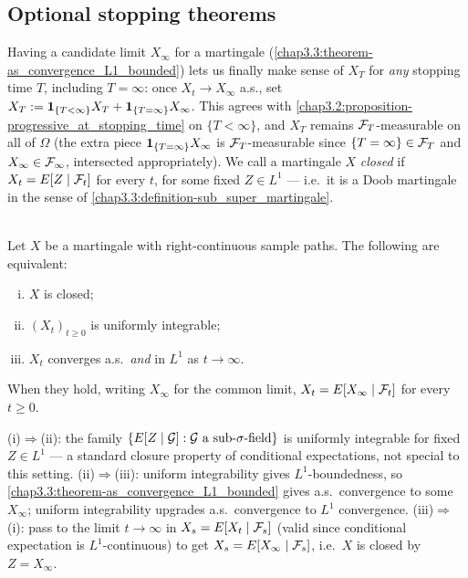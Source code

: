 \subsection{Optional stopping theorems}\label{sec:ost}
Having a candidate limit $X_\infty$ for a martingale (\cref{chap3.3:theorem-as_convergence_L1_bounded}) lets us finally make sense of $X_T$ for \emph{any} stopping time $T$, including $T=\infty$: once $X_t\to X_\infty$ a.s., set $X_T:=\mathbf{1}_{\{T<\infty\}}X_T+\mathbf{1}_{\{T=\infty\}}X_\infty$. This agrees with \cref{chap3.2:proposition-progressive_at_stopping_time} on $\{T<\infty\}$, and $X_T$ remains $\mathcal{F}_T$-measurable on all of $\Omega$ (the extra piece $\mathbf{1}_{\{T=\infty\}}X_\infty$ is $\mathcal{F}_T$-measurable since $\{T=\infty\}\in\mathcal{F}_T$ and $X_\infty\in\mathcal{F}_\infty$, intersected appropriately). We call a martingale $X$ \textit{closed} if $X_t=E[Z\mid\mathcal{F}_t]$ for every $t$, for some fixed $Z\in L^1$ --- i.e.\ it is a Doob martingale in the sense of \cref{chap3.3:definition-sub_super_martingale}.

\begin{theorem} \label{chap3.4:theorem-martingale_equivalence_of_L1_convergence}  \\
Let $X$ be a martingale with right-continuous sample paths. The following are equivalent:
\begin{enumerate}[(i)]
    \item $X$ is closed;
    \item $(X_t)_{t\ge0}$ is uniformly integrable;
    \item $X_t$ converges a.s.\ \emph{and} in $L^1$ as $t\to\infty$.
\end{enumerate}
When they hold, writing $X_\infty$ for the common limit, $X_t=E[X_\infty\mid\mathcal{F}_t]$ for every $t\ge0$.
\end{theorem}
\begin{proofidea}
(i)$\Rightarrow$(ii): the family $\{E[Z\mid\mathcal{G}]:\mathcal{G}\text{ a sub-}\sigma\text{-field}\}$ is uniformly integrable for fixed $Z\in L^1$ --- a standard closure property of conditional expectations, not special to this setting.
(ii)$\Rightarrow$(iii): uniform integrability gives $L^1$-boundedness, so \cref{chap3.3:theorem-as_convergence_L1_bounded} gives a.s.\ convergence to some $X_\infty$; uniform integrability upgrades a.s.\ convergence to $L^1$ convergence.
(iii)$\Rightarrow$(i): pass to the limit $t\to\infty$ in $X_s=E[X_t\mid\mathcal{F}_s]$ (valid since conditional expectation is $L^1$-continuous) to get $X_s=E[X_\infty\mid\mathcal{F}_s]$, i.e.\ $X$ is closed by $Z=X_\infty$.
\end{proofidea}

